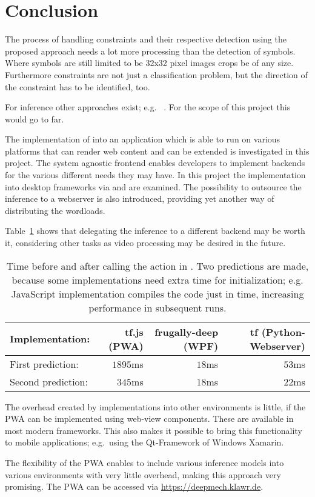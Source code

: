 \section{Conclusion}

The process of handling constraints and their respective detection using the proposed approach needs a lot more processing than the detection of symbols.
Where symbols are still limited to be 32x32 pixel images crops be of any size.
Furthermore constraints are not just a classification problem, but the direction of the constraint has to be identified, too.

For inference other approaches exist; e.g. ~\cite{Bochkovskiy2020}.
For the scope of this project this would go to far.

The implementation of  into an application which is able to run on various platforms that can render web content and can be extended is investigated in this project.
The system agnostic frontend enables developers to implement backends for the various different needs they may have.
In this project the implementation into desktop frameworks via  and  are examined.
The possibility to outsource the inference to a webserver is also introduced, providing yet another way of distributing the wordloads.

Table~\ref{tab:benchmarks} shows that delegating the inference to a different backend may be worth it, considering other tasks as video processing may be desired in the future.

\begin{table}
    \label{tab:benchmarks}
    \caption{
        Time before and after calling the  action in .
        Two predictions are made, because some implementations need extra time for initialization; e.g. JavaScript implementation compiles the code just in time, increasing performance in subsequent runs.}
\begin{tabular}{lrrr}
    \toprule
    Implementation: & tf.js (PWA) & frugally-deep (WPF) & tf (Python-Webserver) \\
    \midrule
    First prediction: & \(1895\)ms & \(18\)ms & \(53\)ms \\
    \midrule
    Second prediction: & \(345\)ms & \(18\)ms & \(22\)ms \\
    \bottomrule
\end{tabular}
\end{table}

The overhead created by implementations into other environments is little, if the PWA can be implemented using web-view components.
These are available in most modern frameworks.
This also makes it possible to bring this functionality to mobile applications; e.g.\ using the Qt-Framework of Windows Xamarin.

The flexibility of the PWA enables to include various inference models into various environments with very little overhead, making this approach very promising.
The PWA can be accessed via \url{https://deepmech.klawr.de}.

